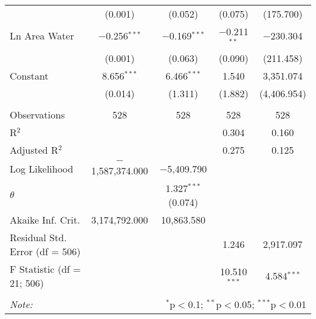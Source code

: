 \begin{table}[!htbp]
\begin{tabular}{@{\extracolsep{5pt}}lcccc}
  & (0.001) & (0.052) & (0.075) & (175.700) \\ 
  Ln Area Water & $-$0.256$^{***}$ & $-$0.169$^{***}$ & $-$0.211$^{**}$ & $-$230.304 \\ 
  & (0.001) & (0.063) & (0.090) & (211.458) \\ 
  Constant & 8.656$^{***}$ & 6.466$^{***}$ & 1.540 & 3,351.074 \\ 
  & (0.014) & (1.311) & (1.882) & (4,406.954) \\ 
 \hline \\[-1.8ex] 
Observations & 528 & 528 & 528 & 528 \\ 
R$^{2}$ &  &  & 0.304 & 0.160 \\ 
Adjusted R$^{2}$ &  &  & 0.275 & 0.125 \\ 
Log Likelihood & $-$1,587,374.000 & $-$5,409.790 &  &  \\ 
$\theta$ &  & 1.327$^{***}$  (0.074) &  &  \\ 
Akaike Inf. Crit. & 3,174,792.000 & 10,863.580 &  &  \\ 
Residual Std. Error (df = 506) &  &  & 1.246 & 2,917.097 \\ 
F Statistic (df = 21; 506) &  &  & 10.510$^{***}$ & 4.584$^{***}$ \\ 
\hline 
\hline \\[-1.8ex] 
\textit{Note:}  & \multicolumn{4}{r}{$^{*}$p$<$0.1; $^{**}$p$<$0.05; $^{***}$p$<$0.01} \\ 
\end{tabular} 
\end{table} 
